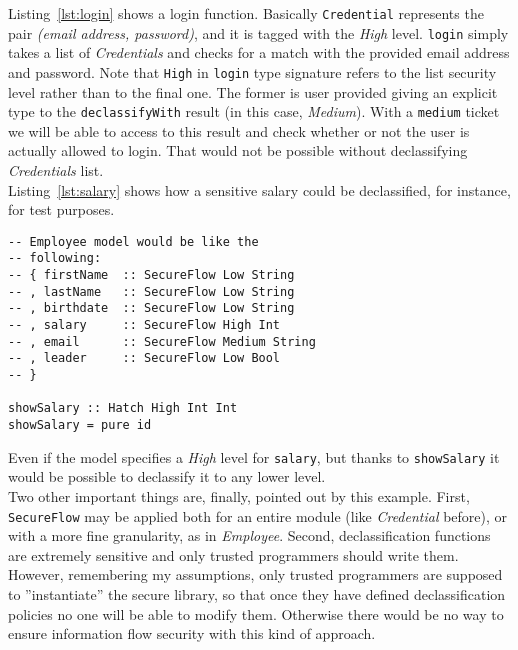Listing~\ref{lst:login} shows a login function. Basically \texttt{Credential} represents the pair \textit{(email address, password)}, and it is tagged with the \textit{High} level. \texttt{login} simply takes a list of \textit{Credentials} and checks for a match with the provided email address and password. Note that \texttt{High} in \texttt{login} type signature refers to the list security level rather than to the final one. The former is user provided giving an explicit type to the \texttt{declassifyWith} result (in this case, \textit{Medium}). With a \texttt{medium} ticket we will be able to access to this result and check whether or not the user is actually allowed to login. That would not be possible without declassifying \textit{Credentials} list. \\
Listing~\ref{lst:salary} shows how a sensitive salary could be declassified, for instance, for test purposes.
\begin{lstlisting}[caption={Declassificated salary}, label={lst:salary}]
-- Employee model would be like the 
-- following:
-- { firstName  :: SecureFlow Low String
-- , lastName   :: SecureFlow Low String
-- , birthdate  :: SecureFlow Low String
-- , salary     :: SecureFlow High Int
-- , email      :: SecureFlow Medium String
-- , leader     :: SecureFlow Low Bool
-- }

showSalary :: Hatch High Int Int
showSalary = pure id 
\end{lstlisting}
Even if the model specifies a \textit{High} level for \texttt{salary}, but thanks to \texttt{showSalary} it would be possible to declassify it to any lower level.\\
Two other important things are, finally, pointed out by this example. First, \texttt{SecureFlow} may be applied both for an entire module (like \textit{Credential} before), or with a more fine granularity, as in \textit{Employee}. Second, declassification functions are extremely sensitive and only trusted programmers should write them. However, remembering my assumptions, only trusted programmers are supposed to ''instantiate'' the secure library, so that once they have defined declassification policies no one will be able to modify them. Otherwise there would be no way to ensure information flow security with this kind of approach.